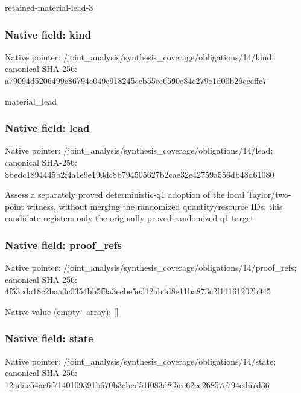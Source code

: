 \documentclass[10pt,a4paper]{article}
\begin{document}
\begingroup\raggedright\sloppy retained-material-lead-3\par\endgroup

\subsubsection{Native field: kind}
Native pointer: /joint\_\allowbreak{}analysis/synthesis\_\allowbreak{}coverage/obligations/14/kind; canonical SHA-256: a79094d5206499c86794e049e918245ccb55ee6590e84c279e1d00b26cceffc7

\begingroup\raggedright\sloppy material\_\allowbreak{}lead\par\endgroup

\subsubsection{Native field: lead}
Native pointer: /joint\_\allowbreak{}analysis/synthesis\_\allowbreak{}coverage/obligations/14/lead; canonical SHA-256: 8bedc1894445b2f4a1e9e190dc8b794505627b2cae32e42759a556db48d61080

\begingroup\raggedright\sloppy Assess a separately proved deterministic-q1 adoption of the local Taylor/\allowbreak{}two-point witness,\allowbreak{} without merging the randomized quantity/\allowbreak{}resource IDs;\allowbreak{} this candidate registers only the originally proved randomized-q1 target.\par\endgroup

\subsubsection{Native field: proof\_\allowbreak{}refs}
Native pointer: /joint\_\allowbreak{}analysis/synthesis\_\allowbreak{}coverage/obligations/14/proof\_\allowbreak{}refs; canonical SHA-256: 4f53cda18c2baa0c0354bb5f9a3ecbe5ed12ab4d8e11ba873c2f11161202b945

Native value (empty\_\allowbreak{}array): []

\subsubsection{Native field: state}
Native pointer: /joint\_\allowbreak{}analysis/synthesis\_\allowbreak{}coverage/obligations/14/state; canonical SHA-256: 12adac54ac6f7140109391b670b3cbcd51f083d8f5ee62ce26857c794ed67d36
\end{document}
